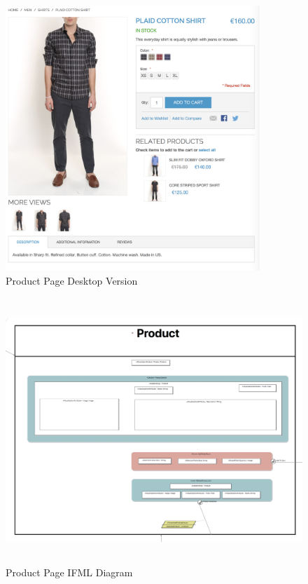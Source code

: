 \newpage
\vspace{0.5cm}
\begin{figure}[H]
  \centering
    \includegraphics[height=10cm]{images/diagrams/before/desktop-product.png}
  \caption{Product Page Desktop Version}
  \label{fig:desktop-before-product}
\end{figure}

\vspace{0.5cm}
\begin{figure}[H]
  \centering
    \includegraphics[height=10cm]{images/diagrams/before/ifml-product.png}
  \caption{Product Page IFML Diagram}
  \label{fig:ifml-before-product}
\end{figure}
\vspace{0.5cm}

